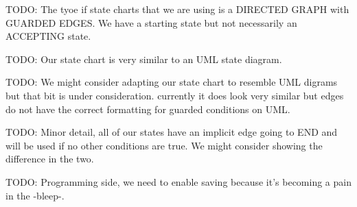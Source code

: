 TODO: The tyoe if state charts that we are using is a DIRECTED GRAPH with GUARDED EDGES. We have a starting state but not necessarily an ACCEPTING state.

TODO: Our state chart is very similar to an UML state diagram.

TODO: We might consider adapting our state chart to resemble UML digrams but that bit is under consideration. currently it does look very similar but edges do not have the correct formatting for guarded conditions on UML.

TODO: Minor detail, all of our states have an implicit edge going to END and will be used if no other conditions are true. We might consider showing the difference in the two.

TODO: Programming side, we need to enable saving because it's becoming a pain in the -bleep-.
